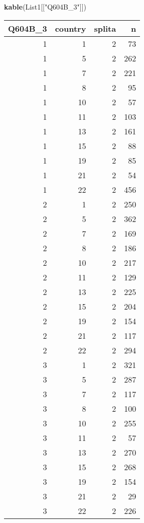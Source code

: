 \documentclass[]{article}
\newenvironment{Shaded}{\begin{snugshade}}{\end{snugshade}}
\newcommand{\KeywordTok}[1]{\textcolor[rgb]{0.13,0.29,0.53}{\textbf{#1}}}
\newcommand{\NormalTok}[1]{#1}
\newcommand{\StringTok}[1]{\textcolor[rgb]{0.31,0.60,0.02}{#1}}
\begin{document}
\begin{Shaded}
\begin{Highlighting}[]
\KeywordTok{kable}\NormalTok{(List1[[}\StringTok{"Q604B_3"}\NormalTok{]])}
\end{Highlighting}
\end{Shaded}

\begin{tabular}{r|r|r|r}
\hline
Q604B\_3 & country & splita & n\\
\hline
1 & 1 & 2 & 73\\
\hline
1 & 5 & 2 & 262\\
\hline
1 & 7 & 2 & 221\\
\hline
1 & 8 & 2 & 95\\
\hline
1 & 10 & 2 & 57\\
\hline
1 & 11 & 2 & 103\\
\hline
1 & 13 & 2 & 161\\
\hline
1 & 15 & 2 & 88\\
\hline
1 & 19 & 2 & 85\\
\hline
1 & 21 & 2 & 54\\
\hline
1 & 22 & 2 & 456\\
\hline
2 & 1 & 2 & 250\\
\hline
2 & 5 & 2 & 362\\
\hline
2 & 7 & 2 & 169\\
\hline
2 & 8 & 2 & 186\\
\hline
2 & 10 & 2 & 217\\
\hline
2 & 11 & 2 & 129\\
\hline
2 & 13 & 2 & 225\\
\hline
2 & 15 & 2 & 204\\
\hline
2 & 19 & 2 & 154\\
\hline
2 & 21 & 2 & 117\\
\hline
2 & 22 & 2 & 294\\
\hline
3 & 1 & 2 & 321\\
\hline
3 & 5 & 2 & 287\\
\hline
3 & 7 & 2 & 117\\
\hline
3 & 8 & 2 & 100\\
\hline
3 & 10 & 2 & 255\\
\hline
3 & 11 & 2 & 57\\
\hline
3 & 13 & 2 & 270\\
\hline
3 & 15 & 2 & 268\\
\hline
3 & 19 & 2 & 154\\
\hline
3 & 21 & 2 & 29\\
\hline
3 & 22 & 2 & 226\\

\end{tabular}
\end{document}
